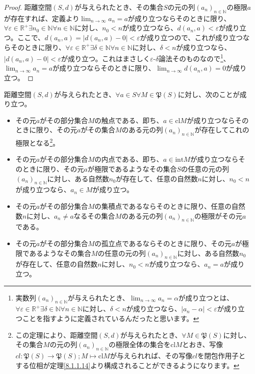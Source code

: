 \documentclass[dvipdfmx]{jsarticle}
\begin{document}
\begin{proof}
距離空間$(S,d)$が与えられたとき、その集合$S$の元の列$\left( a_{n} \right)_{n \in \mathbb{N}}$の極限$a$が存在すれば、定義より$\lim_{n \rightarrow \infty}a_{n} = a$が成り立つならそのときに限り、$\forall\varepsilon \in \mathbb{R}^{+}\exists n_{0} \in \mathbb{N}\forall n \in \mathbb{N}$に対し、$n_{0} < n$が成り立つなら、$d\left( a_{n},a \right) < \varepsilon$が成り立つ。ここで、$d\left( a_{n},a \right) = \left| d\left( a_{n},a \right) - 0 \right| < \varepsilon$が成り立つので、これが成り立つならそのときに限り、$\forall\varepsilon \in \mathbb{R}^{+}\exists\delta \in \mathbb{N}\forall n \in \mathbb{N}$に対し、$\delta < n$が成り立つなら、$\left| d\left( a_{n},a \right) - 0 \right| < \varepsilon$が成り立つ。これはまさしく$\varepsilon $-$\delta $論法そのものなので\footnote{実数列$\left( a_{n} \right)_{n \in \mathbb{N}}$が与えられたとき、$\lim_{n \rightarrow \infty}a_{n} = \alpha$が成り立つとは、$\forall\varepsilon \in \mathbb{R}^{+}\exists\delta \in \mathbb{N}\forall n \in \mathbb{N}$に対し、$\delta < n$が成り立つなら、$\left| a_{n} - \alpha \right| < \varepsilon$が成り立つことを指すように定義されているんだったと思います。}、$\lim_{n \rightarrow \infty}a_{n} = a$が成り立つならそのときに限り、$\lim_{n \rightarrow \infty}{d\left( a_{n},a \right)} = 0$が成り立つ。
\end{proof}
\begin{thm}\label{8.2.1.13}
距離空間$(S,d)$が与えられたとき、$\forall a \in S\forall M \in \mathfrak{P}(S)$に対し、次のことが成り立つ。
\begin{itemize}
\item
  その元$a$がその部分集合$M$の触点である、即ち、$a \in {\mathrm{cl}}M$が成り立つならそのときに限り、その元$a$がその集合$M$のある元の列$\left( a_{n} \right)_{n \in \mathbb{N}}$が存在してこれの極限となる\footnote{この定理により、距離空間$(S,d)$が与えられたとき、$\forall M \in \mathfrak{P}(S)$に対し、その集合$M$の元の列$\left( a_{n} \right)_{n \in \mathbb{N}}$の極限全体の集合を${\mathrm{cl}}M$とおき、写像$cl\mathfrak{:P}(S)\mathfrak{\rightarrow P}(S);M \mapsto {\mathrm{cl}}M$が与えられれば、その写像$cl$を閉包作用子とする位相が定理\ref{8.1.1.14}より構成されることができるようになります。}。
\item
  その元$a$がその部分集合$M$の内点である、即ち、$a \in {\mathrm{int}}M$が成り立つならそのときに限り、その元$a$が極限であるようなその集合$S$の任意の元の列$\left( a_{n} \right)_{n \in \mathbb{N}}$に対し、ある自然数$n_{0}$が存在して、任意の自然数$n$に対し、$n_{0} < n$が成り立つなら、$a_{n} \in M$が成り立つ。
\item
  その元$a$がその部分集合$M$の集積点であるならそのときに限り、任意の自然数$n$に対し、$a_{n} \neq a$なるその集合$M$のある元の列$\left( a_{n} \right)_{n \in \mathbb{N}}$の極限がその元$a$である。
\item
  その元$a$がその部分集合$M$の孤立点であるならそのときに限り、その元$a$が極限であるようなその集合$M$の任意の元の列$\left( a_{n} \right)_{n \in \mathbb{N}}$に対し、ある自然数$n_{0}$が存在して、任意の自然数$n$に対し、$n_{0} < n$が成り立つなら、$a_{n} = a$が成り立つ。
\end{itemize}
\end{thm}
\end{document}
